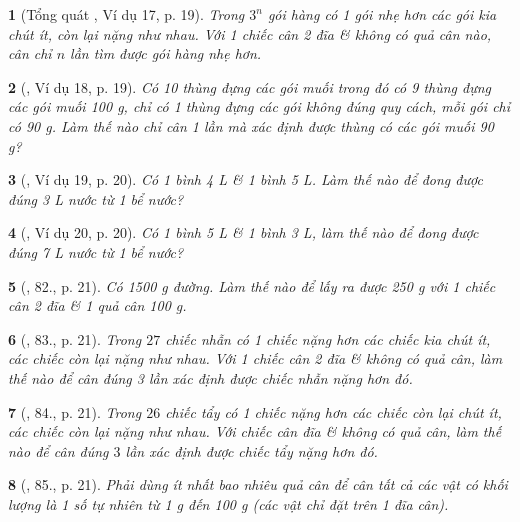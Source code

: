 \documentclass{article}
\newtheorem{baitoan}{}
\begin{document}
\begin{baitoan}[Tổng quát \cite{Tuyen_Toan_6}, Ví dụ 17, p. 19]
	Trong $3^n$ gói hàng có 1 gói nhẹ hơn các gói kia chút ít, còn lại nặng như nhau. Với 1 chiếc cân 2 đĩa \& không có quả cân nào, cân chỉ $n$ lần tìm được gói hàng nhẹ hơn.
\end{baitoan}

\begin{baitoan}[\cite{Tuyen_Toan_6}, Ví dụ 18, p. 19]
	Có 10 thùng đựng các gói muối trong đó có 9 thùng đựng các gói muối {\rm100 g}, chỉ có 1 thùng đựng các gói không đúng quy cách, mỗi gói chỉ có {\rm90 g}. Làm thế nào chỉ cân 1 lần mà xác định được thùng có các gói muối {\rm90 g}?
\end{baitoan}

\begin{baitoan}[\cite{Tuyen_Toan_6}, Ví dụ 19, p. 20]
	Có 1 bình {\rm4 L} \& 1 bình {\rm5 L}. Làm thế nào để đong được đúng {\rm3 L} nước từ 1 bể nước?
\end{baitoan}

\begin{baitoan}[\cite{Tuyen_Toan_6}, Ví dụ 20, p. 20]
	Có 1 bình {\rm5 L} \& 1 bình {\rm3 L}, làm thế nào để đong được đúng {\rm7 L} nước từ 1 bể nước?
\end{baitoan}

\begin{baitoan}[\cite{Tuyen_Toan_6}, 82., p. 21]
	Có {\rm1500 g} đường. Làm thế nào để lấy ra được {\rm250 g} với 1 chiếc cân 2 đĩa \& 1 quả cân {\rm100 g}.
\end{baitoan}

\begin{baitoan}[\cite{Tuyen_Toan_6}, 83., p. 21]
	Trong $27$ chiếc nhẫn có 1 chiếc nặng hơn các chiếc kia chút ít, các chiếc còn lại nặng như nhau. Với 1 chiếc cân 2 đĩa \& không có quả cân, làm thế nào để cân đúng 3 lần xác định được chiếc nhẫn nặng hơn đó.
\end{baitoan}

\begin{baitoan}[\cite{Tuyen_Toan_6}, 84., p. 21]
	Trong $26$ chiếc tẩy có 1 chiếc nặng hơn các chiếc còn lại chút ít, các chiếc còn lại nặng như nhau. Với chiếc cân đĩa \& không có quả cân, làm thế nào để cân đúng $3$ lần xác định được chiếc tẩy nặng hơn đó.
\end{baitoan}

\begin{baitoan}[\cite{Tuyen_Toan_6}, 85., p. 21]
	Phải dùng ít nhất bao nhiêu quả cân để cân tất cả các vật có khối lượng là 1 số tự nhiên từ {\rm1 g} đến {\rm100 g} (các vật chỉ đặt trên 1 đĩa cân).
\end{baitoan}
\end{document}
